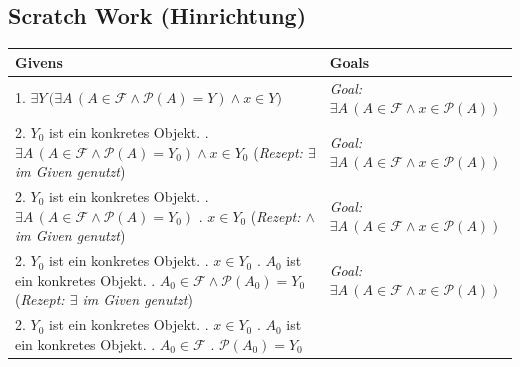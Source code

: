 \documentclass{article}
\begin{document}
\subsection*{Scratch Work (Hinrichtung)}
\begin{center}
\small
\begin{tabular}{ L{0.45\textwidth} | L{0.45\textwidth} }
\toprule
\textbf{Givens} & \textbf{Goals} \\
\midrule
1. $\exists Y \, \Big( \exists A \, (A \in \mathcal{F} \land \mathcal{P}(A) = Y) \land x \in Y \Big)$ &
\emph{Goal:} $\exists A \, (A \in \mathcal{F} \land x \in \mathcal{P}(A))$ \\[1ex]
\hline
2. $Y_0$ ist ein konkretes Objekt. . $\exists A \, (A \in \mathcal{F} \land \mathcal{P}(A) = Y_0) \land x \in Y_0$ \newline
(\emph{Rezept: $\exists$ im Given genutzt}) &
\emph{Goal:} $\exists A \, (A \in \mathcal{F} \land x \in \mathcal{P}(A))$ \\[1ex]
\hline
2. $Y_0$ ist ein konkretes Objekt. . $\exists A \, (A \in \mathcal{F} \land \mathcal{P}(A) = Y_0)$ . $x \in Y_0$ \newline
(\emph{Rezept: $\land$ im Given genutzt}) &
\emph{Goal:} $\exists A \, (A \in \mathcal{F} \land x \in \mathcal{P}(A))$ \\[1ex]
\hline
2. $Y_0$ ist ein konkretes Objekt. . $x \in Y_0$ . $A_0$ ist ein konkretes Objekt. . $A_0 \in \mathcal{F} \land \mathcal{P}(A_0) = Y_0$ \newline
(\emph{Rezept: $\exists$ im Given genutzt}) &
\emph{Goal:} $\exists A \, (A \in \mathcal{F} \land x \in \mathcal{P}(A))$ \\[1ex]
\hline
2. $Y_0$ ist ein konkretes Objekt. . $x \in Y_0$ . $A_0$ ist ein konkretes Objekt. . $A_0 \in \mathcal{F}$ . $\mathcal{P}(A_0) = Y_0$ \newline

\end{tabular}
\end{center}
\end{document}
